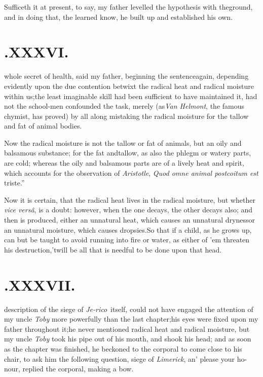 \documentclass{article}
\begin{document}
Sufficeth it at present, to say, my father levelled the
hypothesis with the\break ground, and in doing that, the learned know, he
built up and established his own.\tsh{}

\null\smallskip
\section{.\enspace  XXXVI.}

 whole secret of health, said\break
my father, beginning the sentence\break again, depending evidently upon the
due contention betwixt the radical heat and radical moisture within
us;\tsk the least imaginable skill had been sufficient to have
maintained it, had not the school-men confounded the task, merely
(as\break \textit{Van Helmont}, the famous chymist, has proved) by all
along mistaking the radical moisture for the tallow and fat of
animal bodies.

Now the radical moisture is not the tallow or fat of animals,
but an oily and balsamous substance; for the fat and\break tallow, as
also the phlegm or watery parts, are cold; whereas the oily and
balsamous parts are of a lively heat and spirit, which accounts for
the observation of \textit{Aristotle}, \lqq\textit{Quod omne
animal post\break\lqq coitum est} triste.”

Now it is certain, that the radical heat lives in the radical moisture, but whether
\textit{vice versâ}, is a doubt: however, when the one decays, the other decays
also; and then is produced, either an unnatural heat, which causes an unnatural
dryness\tsh or an unnatural moisture, which causes dropsies.\tsh So that if a child,
as he grows up, can but be taught to avoid running into fire or water, as either of
’em threaten his destruction,\tsh ’twill\break
be all that is needful to be done upon\break
that head.\tsh{}

\null\smallskip
\section{.\enspace  XXXVII.}

 description of the siege of
\textit{Je-\break rico}\sic\  itself, could not have engaged the attention of my
uncle \textit{Toby} more\break
powerfully than the last chapter;\tsk his
eyes were fixed upon my father throughout it;\tsk he never
mentioned radical heat and radical moisture, but my uncle
\textit{Toby}\break
took his pipe out of his mouth, and\break
shook his head; and as soon as the\break
chapter was finished, he beckoned to\break
the corporal to come close to his chair,\break
to ask him the following question,\break
{} 
\break
siege of \textit{Limerick}, an’ please your ho-\break
nour, replied the corporal, making a\break\etp
bow.
\end{document}
